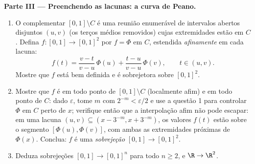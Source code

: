 \begin{problem}
\medskip
\noindent\textbf{Parte III --- Preenchendo as lacunas: a curva de
Peano.}
\begin{enumerate}[resume]
  \item O complementar $[0,1] \setminus C$ é uma reunião enumerável de intervalos
        abertos disjuntos $(u, v)$ (os terços médios removidos)
        cujas extremidades estão em $C$. Defina $f \colon
        [0,1] \to [0,1]^2$ por $f = \Phi$ em
        $C$, estendida \emph{afinamente} em cada lacuna:
        \[
        f(t) = \frac{v - t}{v - u}\,\Phi(u) +
        \frac{t - u}{v - u}\,\Phi(v),
        \qquad t \in (u, v).
        \]
        Mostre que $f$ está bem definida e é sobrejetora sobre
        $[0,1]^2$.
  \item Mostre que $f$ é  em todo ponto de $[0,1]
        \setminus C$
        (localmente afim) e em todo ponto de $C$: dado $\varepsilon$, tome
        $m$ com $2^{-m} <
        \varepsilon/2$ e use a questão 1 para controlar $\Phi$ em
        $C$ perto de $x$; verifique então que a interpolação
        afim não pode escapar: em uma lacuna $(u,v) \subseteq
        (x - 3^{-m}, x + 3^{-m})$, os valores $f(t)$
        estão sobre o segmento $[\Phi(u), \Phi(v)]$, com ambas as extremidades próximas
        de $\Phi(x)$. Conclua: $f$ é uma \emph{sobrejeção }
        $[0,1] \to [0,1]^2$.
  \item Deduza sobrejeções  $[0,1] \to [0,1]^n$ para todo $n \geq 2$, e $\R \to \R^2$.
\end{enumerate}


\end{problem}
